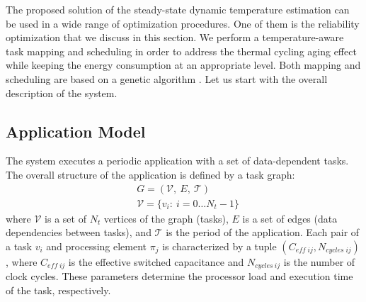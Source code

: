 The proposed solution of the steady-state dynamic temperature estimation can be used in a wide range of optimization procedures. One of them is the reliability optimization that we discuss in this section. We perform a temperature-aware task mapping and scheduling in order to address the thermal cycling aging effect while keeping the energy consumption at an appropriate level. Both mapping and scheduling are based on a genetic algorithm \cite{schmitz2004}. Let us start with the overall description of the system.

\subsection{Application Model}
The system executes a periodic application with a set of data-dependent tasks. The overall structure of the application is defined by a task graph:
\begin{align*}
  & G = (\mathcal{V}, \: E, \: \mathcal{T}) \\
  & \mathcal{V} = \{ v_i: \: i = 0 \dots N_t - 1 \}
\end{align*}
where $\mathcal{V}$ is a set of $N_t$ vertices of the graph (tasks), $E$ is a set of edges (data dependencies between tasks), and $\mathcal{T}$ is the period of the application. Each pair of a task $v_i$ and processing element $\pi_j$ is characterized by a tuple $(C_{eff \; ij}, N_{cycles \; ij})$, where $C_{eff \; ij}$ is the effective switched capacitance and $N_{cycles \: ij}$ is the number of clock cycles. These parameters determine the processor load and execution time of the task, respectively.

